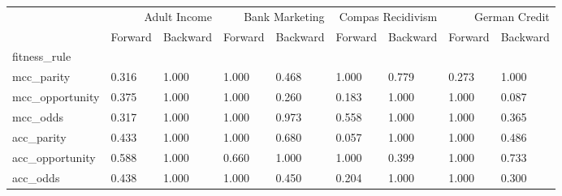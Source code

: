 \begin{tabular}{lllllllll}
\toprule
 & \multicolumn{2}{r}{Adult Income} & \multicolumn{2}{r}{Bank Marketing} & \multicolumn{2}{r}{Compas Recidivism} & \multicolumn{2}{r}{German Credit} \\
 & Forward & Backward & Forward & Backward & Forward & Backward & Forward & Backward \\
fitness_rule &  &  &  &  &  &  &  &  \\
\midrule
mcc_parity & 0.316 & 1.000 & 1.000 & 0.468 & 1.000 & 0.779 & 0.273 & 1.000 \\
mcc_opportunity & 0.375 & 1.000 & 1.000 & 0.260 & 0.183 & 1.000 & 1.000 & 0.087 \\
mcc_odds & 0.317 & 1.000 & 1.000 & 0.973 & 0.558 & 1.000 & 1.000 & 0.365 \\
acc_parity & 0.433 & 1.000 & 1.000 & 0.680 & 0.057 & 1.000 & 1.000 & 0.486 \\
acc_opportunity & 0.588 & 1.000 & 0.660 & 1.000 & 1.000 & 0.399 & 1.000 & 0.733 \\
acc_odds & 0.438 & 1.000 & 1.000 & 0.450 & 0.204 & 1.000 & 1.000 & 0.300 \\
\bottomrule
\end{tabular}

